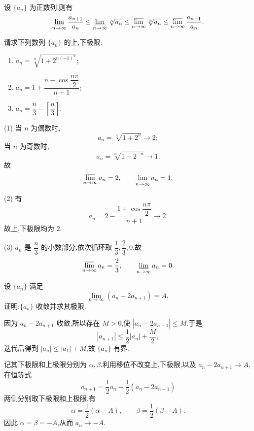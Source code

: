 \begin{proposition}[\markstar]
  设 $\{a_n\}$ 为正数列,则有
  \[
    \varliminf\limits_{n\to\infty}\dfrac{a_{n+1}}{a_n}
    \leq
    \varliminf\limits_{n\to\infty}\sqrt[n]{a_n}
    \leq
    \varlimsup\limits_{n\to\infty}\sqrt[n]{a_n}
    \leq
    \varlimsup\limits_{n\to\infty}\dfrac{a_{n+1}}{a_n}.
  \]
\end{proposition}

\begin{example}
  请求下列数列 $\{a_n\}$ 的上,下极限:
  \begin{enumerate}
    \item $\displaystyle a_n=\sqrt[n]{1+2^{n(-1)^n}}$;
    \item $\displaystyle a_n=1+\dfrac{n-\cos\dfrac{n\pi}{2}}{n+1}$;
    \item $\displaystyle a_n=\dfrac{n}{3}-\left[\dfrac{n}{3}\right]$.
  \end{enumerate}
\end{example}
\exampleblank

\begin{solution}

  (1) 当 $n$ 为偶数时,
  \[
    a_n=\sqrt[n]{1+2^n}\longrightarrow2;
  \]
  当 $n$ 为奇数时,
  \[
    a_n=\sqrt[n]{1+2^{-n}}\longrightarrow1.
  \]
  故
  \[
    \varlimsup\limits_{n\to\infty}a_n=2,
    \qquad
    \varliminf\limits_{n\to\infty}a_n=1.
  \]

  (2) 有
  \[
    a_n=2-\dfrac{1+\cos\dfrac{n\pi}{2}}{n+1}\longrightarrow2.
  \]
  故上,下极限均为 $2$.

  (3) $a_n$ 是 $\dfrac{n}{3}$ 的小数部分,依次循环取 $\dfrac{1}{3},\dfrac{2}{3},0$.故
  \[
    \varlimsup\limits_{n\to\infty}a_n=\dfrac{2}{3},
    \qquad
    \varliminf\limits_{n\to\infty}a_n=0.
  \]
\end{solution}

\begin{example}
  设 $\{a_n\}$ 满足
  \[
    \displaystyle\lim\limits_{n\to\infty}(a_n-2a_{n+1})=A,
  \]
  证明:$\{a_n\}$ 收敛并求其极限.
\end{example}
\exampleblank

\begin{solution}
  因为 $a_n-2a_{n+1}$ 收敛,所以存在 $M>0$,使
  $|a_n-2a_{n+1}|\leq M$.于是
  \[
    |a_{n+1}|\leq\dfrac{1}{2}|a_n|+\dfrac{M}{2},
  \]
  迭代后得到 $|a_n|\leq|a_1|+M$,故 $\{a_n\}$ 有界.

  记其下极限和上极限分别为 $\alpha,\beta$.利用移位不改变上,下极限,以及
  $a_n-2a_{n+1}\to A$,在恒等式
  \[
    a_{n+1}=\dfrac{1}{2}a_n-\dfrac{1}{2}(a_n-2a_{n+1})
  \]
  两侧分别取下极限和上极限,有
  \[
    \alpha=\dfrac{1}{2}(\alpha-A),
    \qquad
    \beta=\dfrac{1}{2}(\beta-A).
  \]
  因此 $\alpha=\beta=-A$,从而 $a_n\to-A$.
\end{solution}

